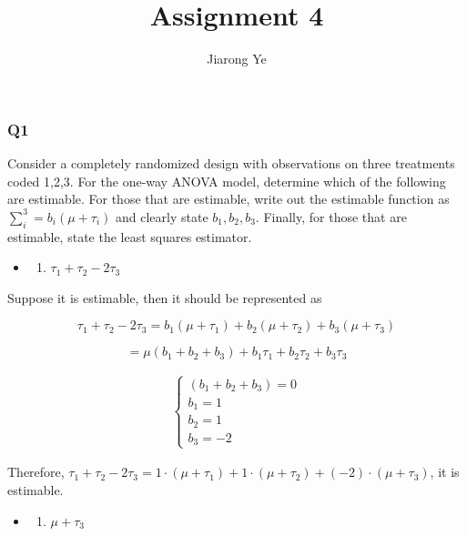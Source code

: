 \documentclass[11pt]{article}
\title{Assignment 4}
\author{Jiarong Ye}
\providecommand{\tightlist}{%
      \setlength{\itemsep}{0pt}\setlength{\parskip}{0pt}}
\begin{document}
    
    
    \maketitle
    
    


    \subsubsection*{Q1}\label{q1}

    Consider a completely randomized design with observations on three
treatments coded 1,2,3. For the one-way ANOVA model, determine which of
the following are estimable. For those that are estimable, write out the
estimable function as \(\sum^3_i=b_i(\mu + \tau_i)\) and clearly state
\(b_1, b_2, b_3\). Finally, for those that are estimable, state the
least squares estimator.

    \begin{itemize}
\item
  \begin{enumerate}
  \def\labelenumi{\alph{enumi})}
  \tightlist
  \item
    \(\tau_1+ \tau_2 - 2\tau_3\)
  \end{enumerate}
\end{itemize}

Suppose it is estimable, then it should be represented as

\[\tau_1+ \tau_2 - 2\tau_3 = b_1 (\mu + \tau_1) + b_2 (\mu + \tau_2) + b_3 (\mu + \tau_3)\]

\[= \mu (b_1+b_2+b_3) + b_1 \tau_1 + b_2 \tau_2 + b_3 \tau_3\]

\begin{align}
\left\{\begin{matrix} (b_1+b_2+b_3) =0
\\ b_1 = 1
\\ b_2 = 1
\\ b_3 = -2
\end{matrix}\right.
\end{align}

Therefore,
\(\tau_1+ \tau_2 - 2\tau_3 = 1 \cdot (\mu + \tau_1) + 1 \cdot (\mu + \tau_2) + (-2) \cdot (\mu + \tau_3)\),
it is estimable.



\begin{itemize}
\item
  \begin{enumerate}
  \def\labelenumi{\alph{enumi})}
  \setcounter{enumi}{1}
  \tightlist
  \item
    \(\mu + \tau_3\)
  \end{enumerate}
\end{itemize}
\end{document}
